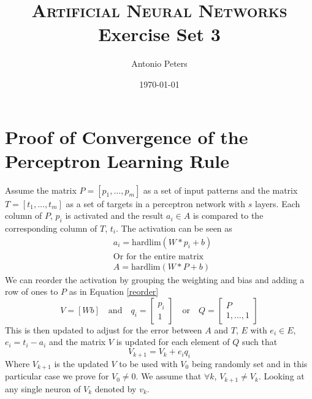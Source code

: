 \documentclass{article}%
\title{	
\textsc{Artificial Neural Networks} \\ [25pt] %
\huge Exercise Set 3 \\ %
}
\author{Antonio Peters} %
\date{\today} %
\begin{document}
\maketitle %
\section{Proof of Convergence of the Perceptron Learning Rule}
Assume the matrix $P = [p_1,\dots,p_m]$ as a set of input patterns and the matrix $T = [t_1,\dots,t_m]$ as a set of targets in a perceptron network with $s$ layers. Each column of $P$, $p_i$ is activated and the result $a_i \in A$ is compared to the corresponding column of $T$, $t_i$. The activation can be seen as
\begin{equation}
\begin{align}
  &a_i = \text{hardlim}(W*p_i + b) \\
  &\text{Or for the entire matrix} \\
  &A = \text{hardlim}(W*P + b)
\end{align}
\end{equation}
We can reorder the activation by grouping the weighting and bias and adding a row of ones to $P$ as in Equation \ref{reorder}
\begin{equation}\label{reorder}
  V = [W b] \quad \text{and} \quad q_i = \begin{bmatrix} p_i \\ 1 \end{bmatrix} \quad \text{or} \quad Q = \begin{bmatrix} P \\ 1,\dots,1 \end{bmatrix}
\end{equation}
This is then updated to adjust for the error between $A$ and $T$, $E$ with $e_i \in E$, $e_i = t_i - a_i$ and the matrix $V$ is updated for each element of $Q$ such that
\begin{equation}
  V_{k+1} = V_k + e_iq_i
\end{equation}
Where $V_{k+1}$ is the updated $V$ to be used with $V_0$ being randomly set and in this particular case we prove for $V_0 \neq 0$. We assume that $\forall k$, $V_{k+1} \neq V_k$. Looking at any single neuron of $V_k$ denoted by $v_k$. 
\end{document}

